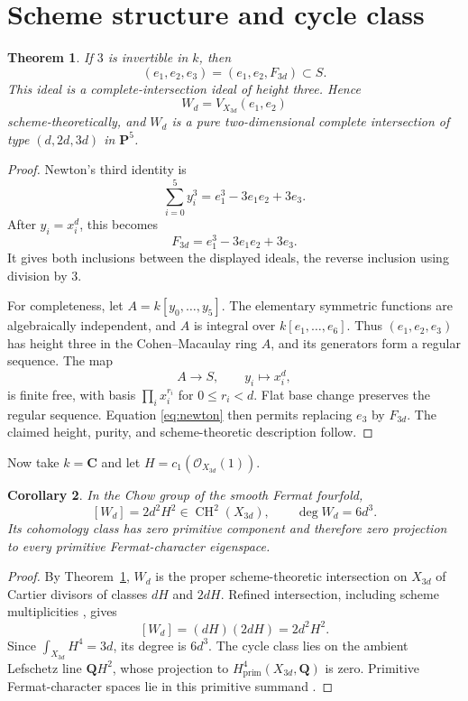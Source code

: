 \documentclass[11pt]{article}
\newtheorem{theorem}{Theorem}[section]
\newtheorem{corollary}[theorem]{Corollary}
\DeclareMathOperator{\CH}{CH}
\begin{document}
\section{Scheme structure and cycle class}
\begin{theorem}\label{thm:ci}
If $3$ is invertible in $k$, then
\[
 (e_1,e_2,e_3)=(e_1,e_2,F_{3d})\subset S.
\]
This ideal is a complete-intersection ideal of height three.  Hence
\[
 W_d=V_{X_{3d}}(e_1,e_2)
\]
scheme-theoretically, and $W_d$ is a pure two-dimensional complete
intersection of type $(d,2d,3d)$ in $\mathbf P^5$.
\end{theorem}
\begin{proof}
Newton's third identity is
\[
 \sum_{i=0}^5y_i^3=e_1^3-3e_1e_2+3e_3.
\]
After $y_i=x_i^d$, this becomes
\begin{equation}\label{eq:newton}
 F_{3d}=e_1^3-3e_1e_2+3e_3.
\end{equation}
It gives both inclusions between the displayed ideals, the reverse inclusion
using division by $3$.

For completeness, let $A=k[y_0,\ldots,y_5]$.  The elementary symmetric
functions are algebraically independent, and $A$ is integral over
$k[e_1,\ldots,e_6]$.  Thus $(e_1,e_2,e_3)$ has height three in the
Cohen--Macaulay ring $A$, and its generators form a regular sequence.  The map
\[
 A\longrightarrow S,\qquad y_i\longmapsto x_i^d,
\]
is finite free, with basis $\prod_i x_i^{r_i}$ for $0\leq r_i<d$.
Flat base change preserves the regular sequence.  Equation
\eqref{eq:newton} then permits replacing $e_3$ by $F_{3d}$.  The claimed
height, purity, and scheme-theoretic description follow.
\end{proof}

Now take $k=\mathbf C$ and let
$H=c_1(\mathcal O_{X_{3d}}(1))$.
\begin{corollary}\label{cor:class}
In the Chow group of the smooth Fermat fourfold,
\[
 [W_d]=2d^2H^2\in\CH^2(X_{3d}),\qquad \deg W_d=6d^3.
\]
Its cohomology class has zero primitive component and therefore zero
projection to every primitive Fermat-character eigenspace.
\end{corollary}
\begin{proof}
By Theorem~\ref{thm:ci}, $W_d$ is the proper scheme-theoretic intersection on
$X_{3d}$ of Cartier divisors of classes $dH$ and $2dH$.  Refined
intersection, including scheme multiplicities \cite{Fulton}, gives
\[
 [W_d]=(dH)(2dH)=2d^2H^2.
\]
Since $\int_{X_{3d}}H^4=3d$, its degree is $6d^3$.
The cycle class lies on the ambient Lefschetz line $\mathbf QH^2$, whose
projection to $H^4_{\mathrm{prim}}(X_{3d},\mathbf Q)$ is zero.  Primitive
Fermat-character spaces lie in this primitive summand \cite{Shioda}.
\end{proof}
\end{document}
